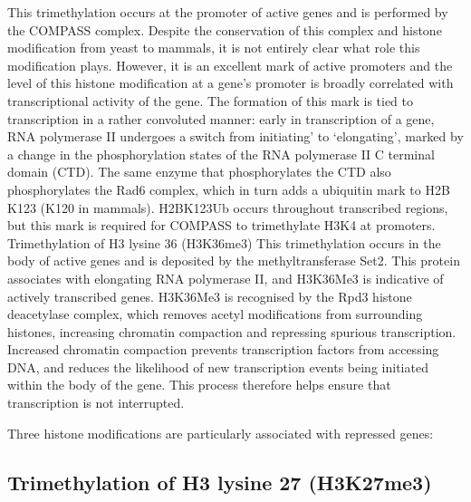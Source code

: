 This trimethylation occurs at the promoter of active genes and is performed by the COMPASS complex. Despite the conservation of this complex and histone modification from yeast to mammals, it is not entirely clear what role this modification plays. However, it is an excellent mark of active promoters and the level of this histone modification at a gene's promoter is broadly correlated with transcriptional activity of the gene. The formation of this mark is tied to transcription in a rather convoluted manner: early in transcription of a gene, RNA polymerase II undergoes a switch from initiating' to `elongating', marked by a change in the phosphorylation states of the RNA polymerase II C terminal domain (CTD). The same enzyme that phosphorylates the CTD also phosphorylates the Rad6 complex, which in turn adds a ubiquitin mark to H2B K123 (K120 in mammals). H2BK123Ub occurs throughout transcribed regions, but this mark is required for COMPASS to trimethylate H3K4 at promoters.
Trimethylation of H3 lysine 36 (H3K36me3)
This trimethylation occurs in the body of active genes and is deposited by the methyltransferase Set2. This protein associates with elongating RNA polymerase II, and H3K36Me3 is indicative of actively transcribed genes. H3K36Me3 is recognised by the Rpd3 histone deacetylase complex, which removes acetyl modifications from surrounding histones, increasing chromatin compaction and repressing spurious transcription. Increased chromatin compaction prevents transcription factors from accessing DNA, and reduces the likelihood of new transcription events being initiated within the body of the gene. This process therefore helps ensure that transcription is not interrupted.

Three histone modifications are particularly associated with repressed genes:

\hypertarget{trimethylation-of-h3-lysine-27-h3k27me3}{%
\subsection{Trimethylation of H3 lysine 27 (H3K27me3)}\label{trimethylation-of-h3-lysine-27-h3k27me3}}

